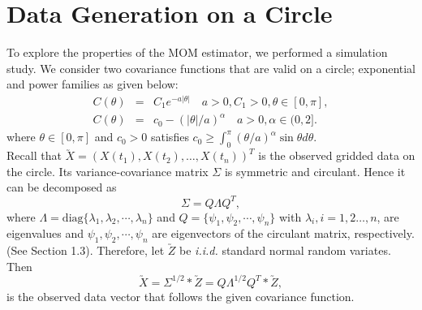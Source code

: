 \vskip 8pt


\vskip 16pt

\section{Data Generation on a Circle}

To explore the properties of the MOM estimator, we performed a simulation study. We consider two covariance functions that are valid on a circle; exponential and power families as given below:
\begin{eqnarray}
\label{exp_cov}
C(\theta) &=& C_1e^{-a|\theta|} \quad a>0, C_1>0, \theta \in [0, \pi], \\
\label{power_cov}
C(\theta) &=& c_0 - (|\theta|/a)^{\alpha} \quad a>0, \alpha \in (0,2].
\end{eqnarray}
where $\theta \in [0,\pi]$ and  $c_0 > 0$ satisfies $c_0 \ge \int_0^\pi(\theta/a)^{\alpha} \sin \theta d \theta$. \\


Recall that $\utilde{X} = (X(t_1), X(t_2), \ldots, X(t_n))^T$ is the observed gridded data on the circle. Its variance-covariance matrix $\Sigma$ is symmetric and circulant. Hence it can be 
decomposed as
\[
\Sigma = Q \Lambda Q^T,
\]
where $\Lambda=\mbox{diag}\{\lambda_1, \lambda_2,\cdots,\lambda_n\}$ and $Q=\{\psi_1, \psi_2,\cdots,\psi_n\}$ with $\lambda_i, i = 1, 2 \ldots, n$, are eigenvalues and $\psi_1, \psi_2,\cdots,\psi_n$ are eigenvectors of the circulant matrix, respectively. (See Section 1.3). Therefore, let $\utilde{Z}$ be {\em i.i.d.} standard normal random variates. Then
\[
	\utilde{X} = \Sigma^{1/2}*\utilde{Z} = Q\Lambda^{1/2}Q^T*\utilde{Z},
\]
is the observed data vector that follows the given covariance function.


